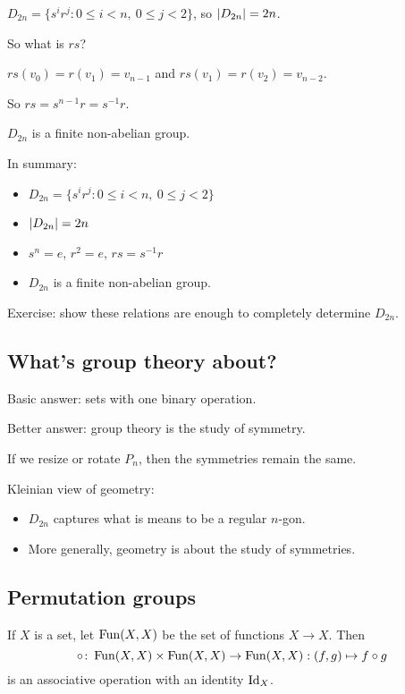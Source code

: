 \documentclass[12pt,letterpaper]{report}
\begin{document}
\begin{prop}{}{}
  $D_{2n} = \{ s^i r^j : 0 \leq i < n, \ 0 \leq j < 2 \}$, so $\lvert D_{2n}\rvert = 2n$.
\end{prop}

So what is $rs$?

$rs(v_0) = r(v_1) = v_{n - 1}$ and $rs(v_1) = r(v_2) = v_{n - 2}$.

So $rs = s^{n - 1} r = s^{-1} r$.

\begin{cor}{}{}
  $D_{2n}$ is a finite non-abelian group.
\end{cor}

In summary:
\begin{itemize}
  \item $D_{2n} = \{ s^i r^j : 0 \leq i < n, \ 0 \leq j < 2 \}$
  \item $\lvert D_{2n}\rvert = 2n$
  \item $s^n = e$, $r^2 = e$, $rs = s^{-1} r$
  \item $D_{2n}$ is a finite non-abelian group.
\end{itemize}
Exercise: show these relations are enough to completely determine $D_{2n}$.

\pagebreak
\subsection{What's group theory about?}

Basic answer: sets with one binary operation.

Better answer: group theory is the study of symmetry.

If we resize or rotate $P_n$, then the symmetries remain the same.

Kleinian view of geometry:
\begin{itemize}
  \item $D_{2n}$ captures what is means to be a regular $n$-gon.
  \item More generally, geometry is about the study of symmetries.
\end{itemize}

\pagebreak
\subsection{Permutation groups}

If $X$ is a set, let $\operatorname{Fun}(X, X)$ be the set of functions $X \to X$.
Then
\[ \circ \colon \operatorname{Fun}(X, X) \times \operatorname{Fun}(X, X) \to \operatorname{Fun}(X, X) : (f, g) \mapsto f \circ g \]
is an associative operation with an identity $\operatorname{Id}_X$.
\end{document}
